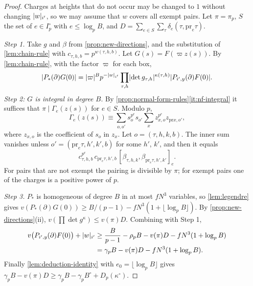 \begin{proof}
Charges at heights that do not occur may be changed to $1$ without changing $\lvert w\rvert_{i'}$, so we may
assume that $w$ covers all exempt pairs. Let $\pi=\pi_p$, $S$ the set of $e\in I_p^\circ$ with
$e\le\log_pB$, and $D=\sum_{e\in S}\sum_\tau\delta_e(\tau,\mathrm{pr}_e\tau)$.

\emph{Step 1.} Take $g$ and $\beta$ from \cref{prop:new-directions}, and the substitution of
\cref{lem:chain-rule} with $c_{\tau,h,b}=p^{w(\tau,h,b)}$. Let $G(s)=F(\varpi z(s))$. By
\cref{lem:chain-rule}, with the factor $\varpi$ for each box,
\[
  \lvert P_*(\partial)G(0)\rvert=\lvert \varpi\rvert^Bp^{-\lvert w\rvert_{i'}}\prod_{\tau,h}\lvert \det g_{\tau,h}\rvert^{\kappa(\tau,h)}
  \lvert P_{i',y}(\partial)F(0)\rvert.
\]
\emph{Step 2: $G$ is integral in degree $B$.} By \cref{prop:normal-form-rules}\ref{it:nf-integral} it
suffices that $\pi\mid\Gamma_e(z(s))$ for $e\in S$. Modulo $p$,
\[
  \Gamma_e(z(s))\equiv\sum_{o,o'}s_o^{p^e}s_{o'}\sum_xz_{x,o}^{p^e}z_{\mathrm{pr}x,o'},
\]
where $z_{x,o}$ is the coefficient of $s_o$ in $z_x$. Let $o=(\tau,h,k,b)$. The inner sum vanishes
unless $o'=(\mathrm{pr}_e\tau,h',k',b)$ for some $h'$, $k'$, and then it equals
\[
  c_{\tau,h,b}^{p^e}\,c_{\mathrm{pr}_e\tau,h',b}\,
  [\beta_{\tau,h,k},\beta_{\mathrm{pr}_e\tau,h',k'}]_e .
\] For
pairs that are not exempt the pairing is divisible by $\pi$; for exempt pairs one of the charges is a
positive power of $p$.

\emph{Step 3.} $P_*$ is homogeneous of degree $B$ in at most $fN^3$ variables, so
\cref{lem:legendre} gives $v(P_*(\partial)G(0))\ge B/(p-1)-fN^3(1+\lfloor\log_pB\rfloor)$. By
\cref{prop:new-directions}(ii), $v(\prod\det g^{\kappa})\le v(\pi)D$. Combining with Step 1,
\begin{align*}
  v\bigl(P_{i',y}(\partial)F(0)\bigr)+\lvert w\rvert_{i'}&\ge\frac B{p-1}-\rho_pB-v(\pi)D-fN^3(1+\log_pB)\\
  &=\gamma_pB-v(\pi)D-fN^3(1+\log_pB).
\end{align*}
Finally \cref{lem:deduction-identity} with $e_0=\lfloor\log_pB\rfloor$ gives
$\gamma_pB-v(\pi)D\ge\gamma_pB-\gamma_pB^\circ+D_p(\kappa^\circ)$.
\end{proof}

